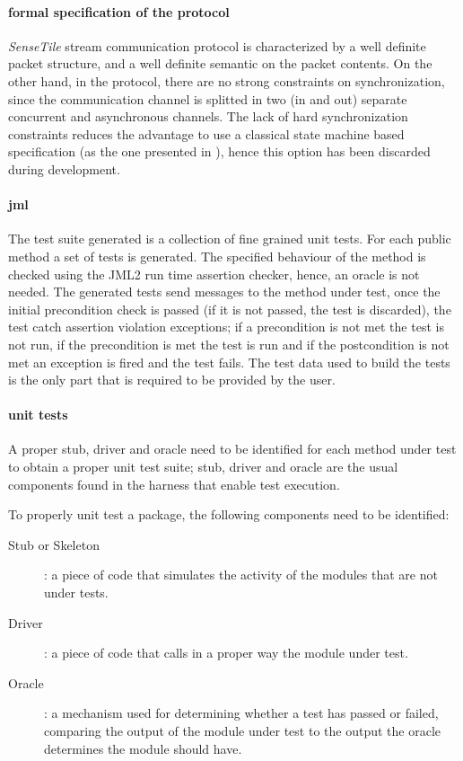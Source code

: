 \documentclass[english]{lni}
\newcommand{\ST}{\emph{SenseTile}\xspace}
\begin{document}
\paragraph{formal specification of the protocol}

\ST stream communication protocol is characterized by a well definite packet structure, and a well definite semantic on the packet contents.  
On the other hand, in the protocol, there are no strong constraints on synchronization, since the communication channel is splitted in two (in and out) separate concurrent and asynchronous channels.
The lack of hard synchronization constraints reduces the advantage to use a classical state machine based specification (as the one presented in \cite{Hubbers2004}), hence this option has been discarded during development.

\paragraph{jml}

The test suite generated is a collection of fine grained unit tests.
For each public method a set of tests is generated.
The specified behaviour of the method is checked using the JML2 run time assertion checker, hence, an oracle is not needed.  
The generated tests send messages to the method under test, once the initial precondition check is passed (if it is not passed, the test is discarded), the test catch assertion violation exceptions; if a precondition is not met the test is not run, if the precondition is met the test is run and if the postcondition is not met an exception is fired and the test fails.
The test data used to build the tests is the only part that is required to be provided by the user.

\paragraph{unit tests}

A proper stub, driver and oracle need to be identified for each method under test to obtain a proper unit test suite; stub, driver and oracle are the usual components found in the harness that enable test execution\cite{Binder1999}.  

To properly unit test a package, the following components need to be identified:
\begin{description}
\item[Stub or Skeleton]: a piece of code that simulates the activity of the modules that are not under tests.
\item[Driver]: a piece of code that calls in a proper way the module under test.
\item[Oracle]: a mechanism used for determining whether a test has passed or failed, comparing the output of the module under test to the output the oracle determines the module should have.
\end{description}
\end{document}
